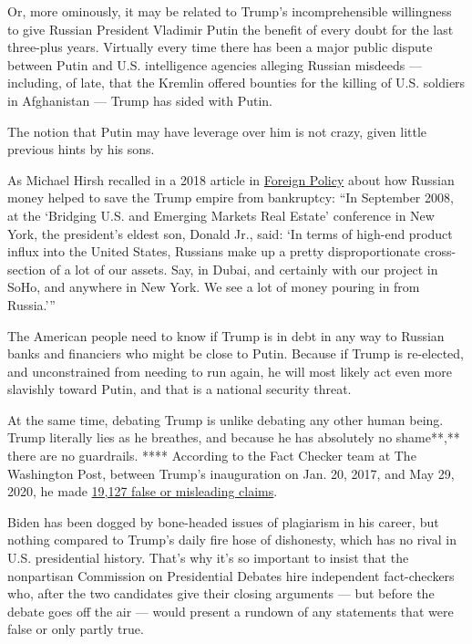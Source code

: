 Or, more ominously, it may be related to Trump's incomprehensible
willingness to give Russian President Vladimir Putin the benefit of
every doubt for the last three-plus years. Virtually every time there
has been a major public dispute between Putin and U.S. intelligence
agencies alleging Russian misdeeds --- including, of late, that the
Kremlin offered bounties for the killing of U.S. soldiers in Afghanistan
--- Trump has sided with Putin.

The notion that Putin may have leverage over him is not crazy, given
little previous hints by his sons.

As Michael Hirsh recalled in a 2018 article in
\href{https://foreignpolicy.com/2018/12/21/how-russian-money-helped-save-trumps-business/}{Foreign
Policy} about how Russian money helped to save the Trump empire from
bankruptcy: ``In September 2008, at the `Bridging U.S. and Emerging
Markets Real Estate' conference in New York, the president's eldest son,
Donald Jr., said: `In terms of high-end product influx into the United
States, Russians make up a pretty disproportionate cross-section of a
lot of our assets. Say, in Dubai, and certainly with our project in
SoHo, and anywhere in New York. We see a lot of money pouring in from
Russia.'''

The American people need to know if Trump is in debt in any way to
Russian banks and financiers who might be close to Putin. Because if
Trump is re-elected, and unconstrained from needing to run again, he
will most likely act even more slavishly toward Putin, and that is a
national security threat.

At the same time, debating Trump is unlike debating any other human
being. Trump literally lies as he breathes, and because he has
absolutely no shame**,** there are no guardrails. **** According to the
Fact Checker team at The Washington Post, between Trump's inauguration
on Jan. 20, 2017, and May 29, 2020, he made
\href{https://www.washingtonpost.com/politics/2020/06/01/president-trump-made-19127-false-or-misleading-claims-1226-days/}{19,127
false or misleading claims}.

Biden has been dogged by bone-headed issues of plagiarism in his career,
but nothing compared to Trump's daily fire hose of dishonesty, which has
no rival in U.S. presidential history. That's why it's so important to
insist that the nonpartisan Commission on Presidential Debates hire
independent fact-checkers who, after the two candidates give their
closing arguments --- but before the debate goes off the air --- would
present a rundown of any statements that were false or only partly true.

